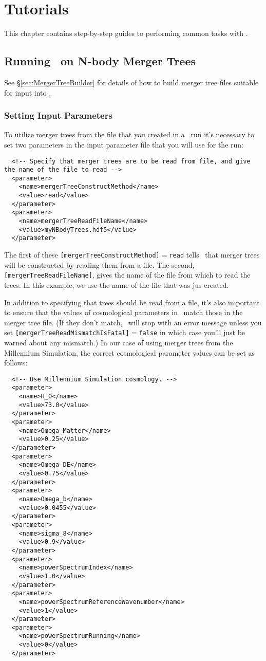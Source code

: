\chapter{Tutorials}

This chapter contains step-by-step guides to performing common tasks with \glc.

\section{Running \glc\ on N-body Merger Trees}\label{sec:nBodyRun}

See \S\ref{sec:MergerTreeBuilder} for details of how to build merger tree files suitable for input into \glc.

\subsection{Setting Input Parameters}

To utilize merger trees from the file that you created in a \glc\ run it's necessary to set two parameters in the input parameter file that you will use for the run:
\begin{verbatim}
  <!-- Specify that merger trees are to be read from file, and give the name of the file to read -->
  <parameter>
    <name>mergerTreeConstructMethod</name>
    <value>read</value>
  </parameter>
  <parameter>
    <name>mergerTreeReadFileName</name>
    <value>myNBodyTrees.hdf5</value>
  </parameter>
\end{verbatim}
The first of these {\tt [mergerTreeConstructMethod]}$=${\tt read} tells \glc\ that merger trees will be constructed by reading them from a file. The second, {\tt [mergerTreeReadFileName]}, gives the name of the file from which to read the trees. In this example, we use the name of the file that was jus created.

In addition to specifying that trees should be read from a file, it's also important to ensure that the values of cosmological parameters in \glc\ match those in the merger tree file. (If they don't match, \glc\ will stop with an error message unless you set {\tt [mergerTreeReadMismatchIsFatal]}$=${\tt false} in which case you'll just be warned about any mismatch.) In our case of using merger trees from the Millennium Simulation, the correct cosmological parameter values can be set as follows:
\begin{verbatim}
  <!-- Use Millennium Simulation cosmology. -->
  <parameter>
    <name>H_0</name>
    <value>73.0</value>
  </parameter>
  <parameter>
    <name>Omega_Matter</name>
    <value>0.25</value>
  </parameter>
  <parameter>
    <name>Omega_DE</name>
    <value>0.75</value>
  </parameter>
  <parameter>
    <name>Omega_b</name>
    <value>0.0455</value>
  </parameter>
  <parameter>
    <name>sigma_8</name>
    <value>0.9</value>
  </parameter>
  <parameter>
    <name>powerSpectrumIndex</name>
    <value>1.0</value>
  </parameter>
  <parameter>
    <name>powerSpectrumReferenceWavenumber</name>
    <value>1</value>
  </parameter>
  <parameter>
    <name>powerSpectrumRunning</name>
    <value>0</value>
  </parameter>
\end{verbatim}

